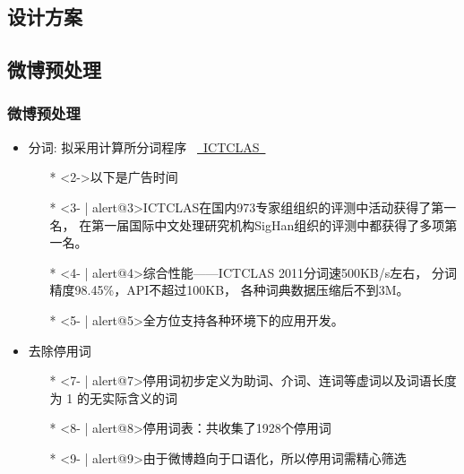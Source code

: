\documentclass[CJKutf8, table]{beamer}
\begin{document}
\begin{CJK}{UTF8}{gbsn}
\section{设计方案}
\subsection{微博预处理}
\begin{frame}
  \frametitle{微博预处理}
  \begin{itemize}
    \item<1- | alert@1>{分词: 拟采用计算所分词程序
      ~\href{http://ictclas.org/}{~ICTCLAS~}}
      \begin{itemize}
        \item[*]<2->{以下是广告时间\smiley}
        \item[*]<3- | alert@3>{ICTCLAS在国内973专家组组织的评测中活动获得了第一名，
          在第一届国际中文处理研究机构SigHan组织的评测中都获得了多项第一名。}
        \item[*]<4- | alert@4>{综合性能——ICTCLAS 2011分词速500KB/s左右，
          分词精度98.45\%，API不超过100KB，
          各种词典数据压缩后不到3M。}
        \item[*]<5- | alert@5>{全方位支持各种环境下的应用开发。}
      \end{itemize}
    \item<6- | alert@6>{去除停用词}
      \begin{itemize}
        \item[*]<7- | alert@7>{停用词初步定义为助词、介词、连词等虚词以及词语长度为
          1 的无实际含义的词}
        \item[*]<8- | alert@8>{停用词表：共收集了1928个停用词}
        \item[*]<9- | alert@9>{由于微博趋向于口语化，所以停用词需精心筛选}
      \end{itemize}
  \end{itemize}
\end{frame}


\end{CJK}
\end{document}
